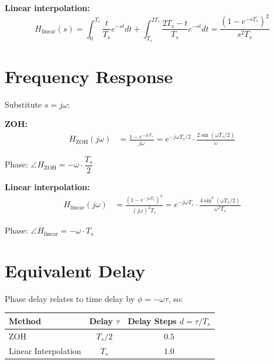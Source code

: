 \documentclass[11pt,a4paper]{article}
\begin{document}
\textbf{Linear interpolation:}
\begin{equation}
H_{\text{linear}}(s) = \int_0^{T_s} \frac{t}{T_s} e^{-st} dt + \int_{T_s}^{2T_s} \frac{2T_s - t}{T_s} e^{-st} dt = \frac{(1 - e^{-sT_s})^2}{s^2 T_s}
\end{equation}

\section{Frequency Response}

Substitute $s = j\omega$:

\textbf{ZOH:}
\begin{align}
H_{\text{ZOH}}(j\omega) &= \frac{1 - e^{-j\omega T_s}}{j\omega} = e^{-j\omega T_s/2} \cdot \frac{2\sin(\omega T_s/2)}{\omega}
\end{align}

Phase: $\boxed{\angle H_{\text{ZOH}} = -\omega \cdot \dfrac{T_s}{2}}$

\textbf{Linear interpolation:}
\begin{align}
H_{\text{linear}}(j\omega) &= \frac{(1 - e^{-j\omega T_s})^2}{(j\omega)^2 T_s} = e^{-j\omega T_s} \cdot \frac{4\sin^2(\omega T_s/2)}{\omega^2 T_s}
\end{align}

Phase: $\boxed{\angle H_{\text{linear}} = -\omega \cdot T_s}$

\section{Equivalent Delay}

Phase delay relates to time delay by $\phi = -\omega \tau$, so:

\begin{table}[h]
\centering
\begin{tabular}{@{}lcc@{}}
\toprule
\textbf{Method} & \textbf{Delay} $\tau$ & \textbf{Delay Steps} $d = \tau/T_s$ \\
\midrule
ZOH & $T_s/2$ & $\boxed{0.5}$ \\
Linear Interpolation & $T_s$ & $\boxed{1.0}$ \\
\bottomrule
\end{tabular}
\end{table}
\end{document}
